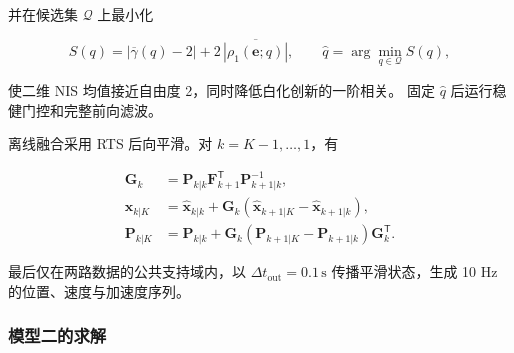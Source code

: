 并在候选集 \(\mathcal Q\) 上最小化

\begin{equation}
S(q)=
\left|\overline{\gamma}(q)-2\right|
+2\,\overline{\left|\rho_1(\mathbf e;q)\right|},
\qquad
\widehat q=\arg\min_{q\in\mathcal Q}S(q),
\label{eq:q2-process-score}
\end{equation}

使二维 NIS 均值接近自由度 2，同时降低白化创新的一阶相关。
固定 \(\widehat q\) 后运行稳健门控和完整前向滤波。

离线融合采用 RTS 后向平滑。对 \(k=K-1,\ldots,1\)，有

\begin{equation}
\begin{aligned}
\mathbf G_k
&=\mathbf P_{k|k}\mathbf F_{k+1}^\mathsf T
\mathbf P_{k+1|k}^{-1},\\
\widehat{\mathbf x}_{k|K}
&=\widehat{\mathbf x}_{k|k}
+\mathbf G_k
\left(\widehat{\mathbf x}_{k+1|K}
-\widehat{\mathbf x}_{k+1|k}\right),\\
\mathbf P_{k|K}
&=\mathbf P_{k|k}
+\mathbf G_k
\left(\mathbf P_{k+1|K}-\mathbf P_{k+1|k}\right)
\mathbf G_k^\mathsf T.
\end{aligned}
\label{eq:q2-rts}
\end{equation}

最后仅在两路数据的公共支持域内，以
\(\Delta t_{\mathrm{out}}=0.1\,\mathrm s\) 传播平滑状态，生成 10 Hz
的位置、速度与加速度序列。

\subsubsection{模型二的求解}\label{sec:q2-solution}

